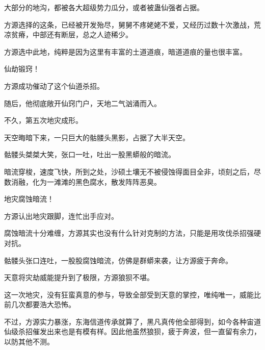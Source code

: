 \begin{this_body}
大部分的地沟，都被各大超级势力瓜分，或者被蛊仙强者占据。

方源选择的这条，已经被开发殆尽，舅舅不疼姥姥不爱，又经历过数十次激战，荒凉贫瘠，中部还有断层，总之人迹稀少。

方源选中此地，纯粹是因为这里有丰富的土道道痕，暗道道痕的量也很丰富。

仙劫锻窍！

方源成功催动了这个仙道杀招。

随后，他彻底敞开仙窍门户，天地二气汹涌而入。

不久，第五次地灾成形。

天空晦暗下来，一只巨大的骷髅头黑影，占据了大半天空。

骷髅头桀桀大笑，张口一吐，吐出一股黑蟒般的暗流。

暗流穿梭，速度飞快，所到之处，沙硕土壤无不被侵蚀得面目全非，顷刻之后，尽数消融，化为一滩滩的黑色腐水，散发阵阵恶臭。

地灾腐蚀暗流！

方源认出地灾跟脚，连忙出手应对。

腐蚀暗流十分难缠，方源其实也没有什么针对克制的方法，只能是用攻伐杀招强硬对抗。

骷髅头张口连吐，一股股腐蚀暗流，仿佛是群蟒来袭，让方源疲于奔命。

天意将灾劫威能提升到了极限，方源狼狈不堪。

这一次地灾，没有狂蛮真意的参与，导致全部受到天意的掌控，唯纯唯一，威能比前几次都要浩大恐怖。

不过，方源实力暴涨，东海信道传承就算了，黑凡真传他全部得到，如今各种宙道仙级杀招催发出来也是有模有样。因此他虽然狼狈，疲于奔波，但一直留有余力，以防其他不测。

\end{this_body}

